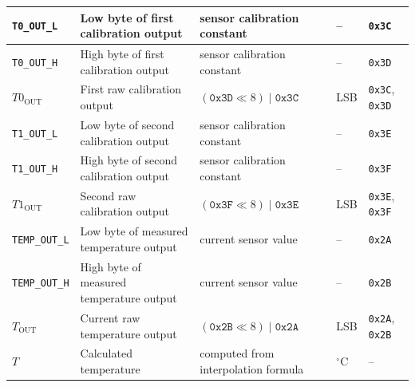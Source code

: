 \begin{table}[H]
\begin{tabularx}{\textwidth}{|>{\raggedright\arraybackslash}X|>{\raggedright\arraybackslash}X|>{\raggedright\arraybackslash}p{2.7cm}|>{\raggedright\arraybackslash}p{2.2cm}|>{\raggedright\arraybackslash}p{3cm}|}
		\texttt{T0\_OUT\_L}       & Low byte of first calibration output                          & sensor calibration constant                        & --                           & \texttt{0x3C}                \\ \hline
		\texttt{T0\_OUT\_H}       & High byte of first calibration output                         & sensor calibration constant                        & --                           & \texttt{0x3D}                \\ \hline
		\(T0_{\mathrm{OUT}}\)     & First raw calibration output                                  & \((\texttt{0x3D} \ll 8)\;|\;\texttt{0x3C}\)        & LSB                          & \texttt{0x3C}, \texttt{0x3D} \\ \hline
		\texttt{T1\_OUT\_L}       & Low byte of second calibration output                         & sensor calibration constant                        & --                           & \texttt{0x3E}                \\ \hline
		\texttt{T1\_OUT\_H}       & High byte of second calibration output                        & sensor calibration constant                        & --                           & \texttt{0x3F}                \\ \hline
		\(T1_{\mathrm{OUT}}\)     & Second raw calibration output                                 & \((\texttt{0x3F} \ll 8)\;|\;\texttt{0x3E}\)        & LSB                          & \texttt{0x3E}, \texttt{0x3F} \\ \hline
		\texttt{TEMP\_OUT\_L}     & Low byte of measured temperature output                       & current sensor value                               & --                           & \texttt{0x2A}                \\ \hline
		\texttt{TEMP\_OUT\_H}     & High byte of measured temperature output                      & current sensor value                               & --                           & \texttt{0x2B}                \\ \hline
		\(T_{\mathrm{OUT}}\)      & Current raw temperature output                                & \((\texttt{0x2B} \ll 8)\;|\;\texttt{0x2A}\)        & LSB                          & \texttt{0x2A}, \texttt{0x2B} \\ \hline
		\(T\)                     & Calculated temperature                                        & computed from interpolation formula                & \(^\circ\mathrm{C}\)         & --                           \\ \hline
	\end{tabularx}
\end{table}

